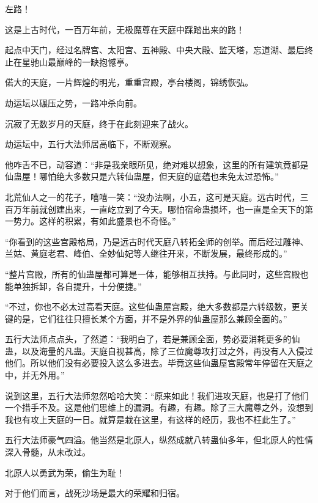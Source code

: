 
\begin{this_body}



左路！

这是上古时代，一百万年前，无极魔尊在天庭中踩踏出来的路！

起点中天门，经过名牌宫、太阳宫、五神殿、中央大殿、监天塔，忘道湖、最后终止在星驰山最巅峰的一缺抱憾亭。

偌大的天庭，一片辉煌的明光，重重宫殿，亭台楼阁，锦绣恢弘。

劫运坛以碾压之势，一路冲杀向前。

沉寂了无数岁月的天庭，终于在此刻迎来了战火。

劫运坛中，五行大法师居高临下，不断观察。

他咋舌不已，动容道：“非是我亲眼所见，绝对难以想象，这里的所有建筑竟都是仙蛊屋！哪怕绝大多数只是六转仙蛊屋，但天庭的底蕴也未免太过恐怖。”

北荒仙人之一的花子，嘻嘻一笑：“没办法啊，小五，这可是天庭。远古时代，三百万年前就创建出来，一直屹立到了今天。哪怕宿命蛊损坏，也一直是全天下的第一势力。这样的积累，有如此盛景也不奇怪。”

“你看到的这些宫殿格局，乃是远古时代天庭八转拓全师的创举。而后经过雕神、兰姑、黄庭老君、峰伯、全妙仙妃等人继往开来，不断发展，最终形成的。”

“整片宫殿，所有的仙蛊屋都可算是一体，能够相互扶持。与此同时，这些宫殿也能单独拆卸，各自提升，十分便捷。”

“不过，你也不必太过高看天庭。这些仙蛊屋宫殿，绝大多数都是六转级数，更关键的是，它们往往只擅长某个方面，并不是外界的仙蛊屋那么兼顾全面的。”

五行大法师点点头，了然道：“我明白了，若是兼顾全面，势必要消耗更多的仙蛊，以及海量的凡蛊。天庭自视甚高，除了三位魔尊攻打过之外，再没有人入侵过他们。所以他们没有必要投入这么多进去。毕竟这些仙蛊屋宫殿常年停留在天庭之中，并无外用。”

说到这里，五行大法师忽然哈哈大笑：“原来如此！我们进攻天庭，也是打了他们一个措手不及。这是他们思维上的漏洞。有趣，有趣。除了三大魔尊之外，没想到我也有攻上天庭的一日。就算是栽在这里，有这样的经历，我也不枉此生了。”

五行大法师豪气四溢。他当然是北原人，纵然成就八转蛊仙多年，但北原人的性情深入骨髓，从未改过。

北原人以勇武为荣，偷生为耻！

对于他们而言，战死沙场是最大的荣耀和归宿。


\end{this_body}
